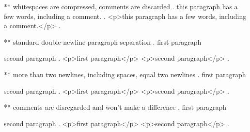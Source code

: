 ** whitespaces are compressed, comments are discarded
.
   this     paragraph  has a    few 
 words,   including
a comment.
.
<p>this paragraph has a few words, including a comment.</p>
.


** standard double-newline paragraph separation
.
first paragraph

second paragraph
.
<p>first paragraph</p>
<p>second paragraph</p>
.



** more than two newlines, including spaces, equal two newlines
.
first paragraph

   
  


second paragraph
.
<p>first paragraph</p>
<p>second paragraph</p>
.


** comments are disregarded and won't make a difference
.
first paragraph




second paragraph
.
<p>first paragraph</p>
<p>second paragraph</p>
.



